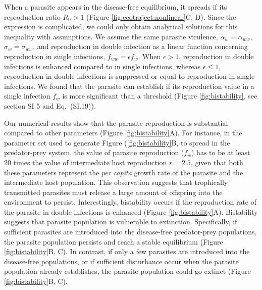 \documentclass[a4paper]{scrartcl}
\begin{document}
When a parasite appears in the disease-free equilibrium, it spreads if its reproduction ratio $R_0 > 1$ (Figure \ref{fig:ecotraject:nonlinear}C, D). 
Since the expression is complicated, we could only obtain analytical solutions for this inequality with assumptions. 
We assume the same parasite virulence, $\alpha_w = \alpha_{ww}$, $\sigma_w = \sigma_{ww}$, and reproduction in double infection as a linear function concerning reproduction in single infections, $f_{ww} = \epsilon f_w$. 
When $\epsilon > 1$, reproduction in double infections is enhanced compared to in single infections, whereas $\epsilon \leq 1$, reproduction in double infections is suppressed or equal to reproduction in single infections.
We found that the parasite can establish if its reproduction value in a single infection $f_w$ is more significant than a threshold (Figure \ref{fig:bistability}, see section SI 5 and Eq.~(SI.19)). 

Our numerical results show that the parasite reproduction is substantial compared to other parameters (Figure \ref{fig:bistability}A). 
For instance, in the parameter set used to generate Figure (\ref{fig:bistability}B, to spread in the predator-prey system, the value of parasite reproduction ($f_w$) has to be at least  20 times the value of intermediate host reproduction $r = 2.5$, given that both these parameters represent the \textit{per capita} growth rate of the parasite and the intermediate host population.
This observation suggests that trophically transmitted parasites must release a large amount of offspring into the environment to persist. 
Interestingly, bistability occurs if the reproduction rate of the parasite in double infections is enhanced (Figure \ref{fig:bistability}A). 
Bistability suggests that parasite population is vulnerable to extinction. 
Specifically, if sufficient parasites are introduced into the disease-free predator-prey populations, the parasite population persists and reach a stable equilibrium (Figure \ref{fig:bistability}B, C). 
In contrast, if only a few parasites are introduced into the disease-free populations, or if sufficient disturbance occur when the parasite population already establishes, the parasite population could go extinct (Figure \ref{fig:bistability}B, C).
\end{document}
